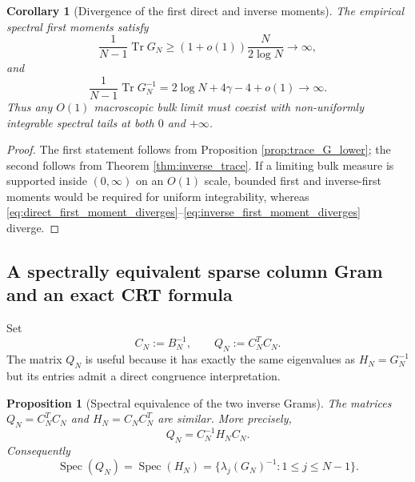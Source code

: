 \documentclass[11pt]{amsart}
\numberwithin{equation}{section}
\theoremstyle{plain}
\newtheorem{proposition}[theorem]{Proposition}
\newtheorem{corollary}[theorem]{Corollary}
\theoremstyle{definition}
\theoremstyle{remark}
\newcommand{\Tr}{\operatorname{Tr}}
\newcommand{\Spec}{\operatorname{Spec}}
\begin{document}
\begin{corollary}[Divergence of the first direct and inverse moments]
\label{cor:moment_divergence}
The empirical spectral first moments satisfy
\begin{equation}
\frac{1}{N-1}\Tr G_N
\ge (1+o(1))\frac{N}{2\log N}\longrightarrow\infty,
\label{eq:direct_first_moment_diverges}
\end{equation}
and
\begin{equation}
\frac{1}{N-1}\Tr G_N^{-1}
=2\log N+4\gamma-4+o(1)\longrightarrow\infty.
\label{eq:inverse_first_moment_diverges}
\end{equation}
Thus any $O(1)$ macroscopic bulk limit must coexist with non-uniformly integrable spectral tails at both $0$ and $+\infty$.
\end{corollary}

\begin{proof}
The first statement follows from Proposition \ref{prop:trace_G_lower}; the second follows from Theorem \ref{thm:inverse_trace}.  If a limiting bulk measure is supported inside $(0,\infty)$ on an $O(1)$ scale, bounded first and inverse-first moments would be required for uniform integrability, whereas \eqref{eq:direct_first_moment_diverges}--\eqref{eq:inverse_first_moment_diverges} diverge.
\end{proof}


\subsection{A spectrally equivalent sparse column Gram and an exact CRT formula}
\label{subsec:column_gram_crt}

Set
\begin{equation}
C_N:=B_N^{-1},
\qquad
Q_N:=C_N^TC_N.
\label{eq:QN_definition}
\end{equation}
The matrix $Q_N$ is useful because it has exactly the same eigenvalues as $H_N=G_N^{-1}$ but its entries admit a direct congruence interpretation.

\begin{proposition}[Spectral equivalence of the two inverse Grams]
\label{prop:QH_similarity}
The matrices $Q_N=C_N^TC_N$ and $H_N=C_NC_N^T$ are similar.  More precisely,
\begin{equation}
Q_N=C_N^{-1}H_NC_N.
\label{eq:QH_similarity}
\end{equation}
Consequently
\begin{equation}
\Spec(Q_N)=\Spec(H_N)=\{\lambda_j(G_N)^{-1}:1\le j\le N-1\}.
\label{eq:QH_same_spectrum}
\end{equation}
\end{proposition}
\end{document}
